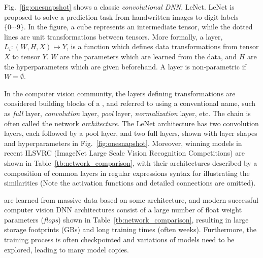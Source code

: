 \documentclass[conference]{IEEEtran}
\begin{document}
Fig.~\ref{fig:onesnapshot} shows a classic {\em convolutional DNN}, LeNet. LeNet is proposed to solve a prediction task from handwritten images to digit labels $\{0\cdots9\}$. In the figure, a cube represents an intermediate tensor, while the dotted lines are unit transformations between tensors. More formally, a layer, $L_i : (W,H,X) \mapsto  Y$, is a function which defines data transformations from tensor $X$ to tensor $Y$. $W$ are the parameters which are learned from the data, and $H$ are the hyperparameters which are given beforehand. A layer is non-parametric if $W = \emptyset$. 


In the computer vision community, the layers defining transformations are considered building blocks of a \dnn\model, and referred to using a conventional name, such as {\em full} layer, {\em convolution} layer, {\em pool} layer, {\em normalization} layer, etc. The chain is often called the network \emph{architecture}. The LeNet architecture has two convolution layers, each followed by a pool layer, and two full layers, shown with layer shapes and hyperparameters in Fig.~\ref{fig:onesnapshot}.
Moreover, winning models in recent ILSVRC (ImageNet Large Scale Vision Recognition Competitions) are shown in Table~\ref{tb:network_comparison}, with their architectures described by a composition of common layers in regular expressions syntax for illustrating the similarities (Note the activation functions and detailed connections are omitted).  %


\dnn\models are learned from massive data based on some architecture, and 
modern successful computer vision DNN architectures consist of a large number of float weight parameters (\emph{flops}) 
 shown in Table~\ref{tb:network_comparison}, resulting in large storage footprints (GBs) and long training times (often weeks). Furthermore, the training process is often checkpointed and variations of models need to be explored, leading to many model copies.
\end{document}
